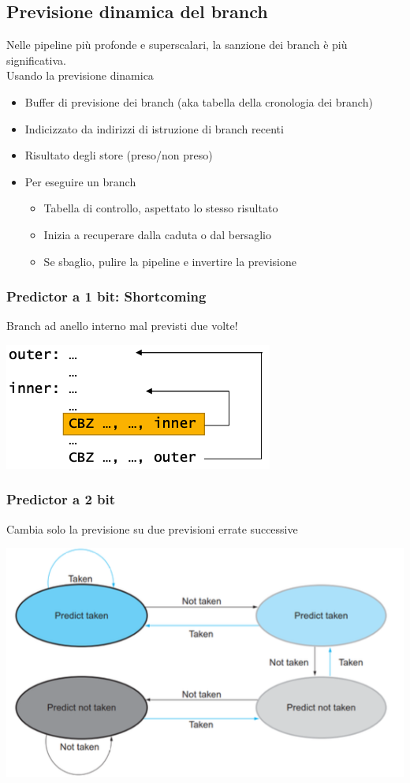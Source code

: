 \documentclass[12pt,a4paper]{article}
\begin{document}
\subsection{Previsione dinamica del branch}
Nelle pipeline più profonde e superscalari, la sanzione dei branch è più significativa.\\
Usando la previsione dinamica
\begin{itemize}
\item Buffer di previsione dei branch (aka tabella della cronologia dei branch)
\item Indicizzato da indirizzi di istruzione di branch recenti
\item Risultato degli store (preso/non preso)
\item Per eseguire un branch
\begin{itemize}
\item Tabella di controllo, aspettato lo stesso risultato
\item Inizia a recuperare dalla caduta o dal bersaglio
\item Se sbaglio, pulire la pipeline e invertire la previsione
\end{itemize}
\end{itemize}
\subsubsection{Predictor a 1 bit: Shortcoming}
Branch ad anello interno mal previsti due volte!
\begin{center}
\includegraphics[width=0.6\columnwidth]{img/1bit_predictor.png}
\end{center}

\subsubsection{Predictor a 2 bit}
Cambia solo la previsione su due previsioni errate successive
\begin{center}
\includegraphics[width=0.6\columnwidth]{img/2bit_predictor.png}
\end{center}
\end{document}
